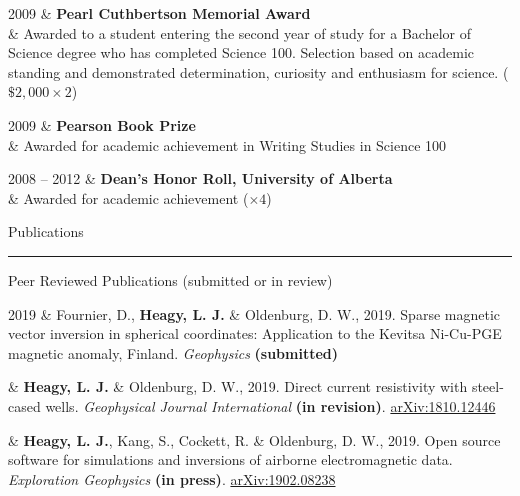 \documentclass[a4paper, 11pt]{article}
\newcommand{\arxiv}[1]{\href{https://arxiv.org/abs/#1}{arXiv:#1}}
\newcommand{\heading}[1]{
    \begin{minipage}[t]{\textwidth}
    \vspace{0.45cm}
    {\LARGE #1}\\
    \vspace{-0.2cm}
    \hrule
    \end{minipage}
    \vspace{0.2cm}

}
\newcommand{\subheading}[1]{
    \vspace{0.4cm}
    {\Large #1}\\
    \vspace{-0.2cm}
}
\begin{document}
\begin{entryright}
2009 & \textbf{Pearl Cuthbertson Memorial Award} \\
& Awarded to a student entering the second year of study for a Bachelor of Science degree who has completed Science 100. Selection based on academic standing and demonstrated determination, curiosity and enthusiasm for science. ($\$2,000 \times 2$)
\end{entryright}

\begin{entryright}
2009 & \textbf{Pearson Book Prize}\\
& Awarded for academic achievement in Writing Studies in Science 100
\end{entryright}

\begin{entryright}
2008 -- 2012 & \textbf{Dean's Honor Roll, University of Alberta} \\
& Awarded for academic achievement ($\times 4$)
\end{entryright}

\clearpage
\heading{Publications}

% 
% 

\subheading{Peer Reviewed Publications (submitted or in review)}

\begin{entryright}
2019 & Fournier, D., \textbf{Heagy, L. J.} \& Oldenburg, D. W., 2019. Sparse magnetic vector inversion in spherical coordinates: Application to the Kevitsa Ni-Cu-PGE magnetic anomaly, Finland. \emph{Geophysics} \textbf{(submitted)}
\end{entryright}

\begin{entryright}
& \textbf{Heagy, L. J.} \& Oldenburg, D. W., 2019. Direct current resistivity with steel-cased wells. \emph{Geophysical Journal International} \textbf{(in revision)}. \arxiv{1810.12446}
\end{entryright}

\begin{entryright}
& \textbf{Heagy, L. J.}, Kang, S., Cockett, R. \& Oldenburg, D. W., 2019. Open source software for simulations and inversions of airborne electromagnetic data. \emph{Exploration Geophysics} \textbf{(in press)}. \arxiv{1902.08238}
\end{entryright}
\end{document}
